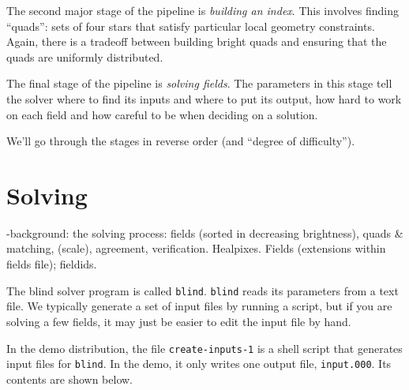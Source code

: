 \documentclass[12pt,letterpaper,titlepage]{article}
\newcommand{\code}[1]{\texttt{#1}}
\begin{document}
The second major stage of the pipeline is \emph{building an index}.  This involves finding
``quads'': sets of four stars that satisfy particular local geometry constraints.  Again, there
is a tradeoff between building bright quads and ensuring that the quads are uniformly distributed.

The final stage of the pipeline is \emph{solving fields}.  The parameters in this stage tell the
solver where to find its inputs and where to put its output, how hard to work on each field
and how careful to be when deciding on a solution.

We'll go through the stages in reverse order (and ``degree of difficulty'').

\section{Solving}

-background: the solving process: fields (sorted in decreasing brightness),
 quads \& matching, (scale), agreement, verification.  Healpixes.  Fields
 (extensions within fields file); fieldids.


The blind solver program is called \code{blind}.
\code{blind} reads its parameters from a text file.  We typically generate a set of
input files by running a script, but if you are solving a few fields, it may just be easier to edit
the input file by hand.

In the demo distribution, the file \code{create-inputs-1} is a shell script that generates
input files for \code{blind}.  In the demo, it only writes one output file, \code{input.000}.
Its contents are shown below.
\end{document}
